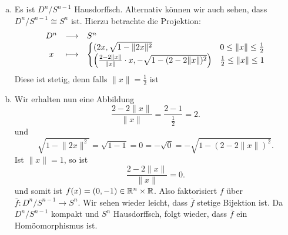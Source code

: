 \begin{example}
    \begin{enumerate}[a)]
        \item
Es ist $D^n / S^{n-1}$   Hausdorffsch. Alternativ können wir auch sehen, dass $D^n / S^{n-1} \cong S^n$ ist. Hierzu betrachte die Projektion:
    \begin{equation*}
    \begin{array}{c c l} 
    D^n & \longrightarrow & S^n \\
    x & \longmapsto &  \begin{cases}
        (2x, \sqrt{1-\lVert 2x \rVert ^2} & 0 \leq  \lVert x \rVert \leq \frac{1}{2}  \\
        \left( \frac{2-2\lVert x \rVert }{\lVert x \rVert }\cdot x, - \sqrt{1-(2-2\lVert x \rVert )^2}  \right) & \frac{1}{2} \leq  \lVert x \rVert  \leq 1
    \end{cases}
    \end{array}
\end{equation*}
Diese ist stetig, denn falls $\lVert x \rVert =\frac{1}{2}$ ist
\item Wir erhalten nun eine Abbildung 
\[
\frac{2-2\lVert x \rVert }{\lVert x \rVert } = \frac{2-1}{\frac{1}{2}} = 2
.\] 
und
\[
    \sqrt{1-\lVert 2x \rVert ^2} = \sqrt{1-1} =0 = - \sqrt{0} = -\sqrt{1-(2-2\lVert x \rVert )^2}  
.\] 
Ist $\lVert x \rVert =1$, so ist
 \[
\frac{2-2\lVert x \rVert }{\lVert x \rVert } = 0
.\] 
und somit ist $f(x) = (0,-1) \in \mathbb{R}^n \times \mathbb{R}$. Also faktorisiert $f$ über  $\overline{f} : D^n / S^{n-1} \to  S^n$. Wir sehen wieder leicht, dass $\overline{f}$ stetige Bijektion ist. Da $D^n / S^{n-1}$ kompakt und $S^n$ Hausdorffsch, folgt wieder, dass  $\overline{f}$ ein Homöomorphismus ist. \\
    \end{enumerate}
\end{example}

\def\Base{\mathcal{S}} %
